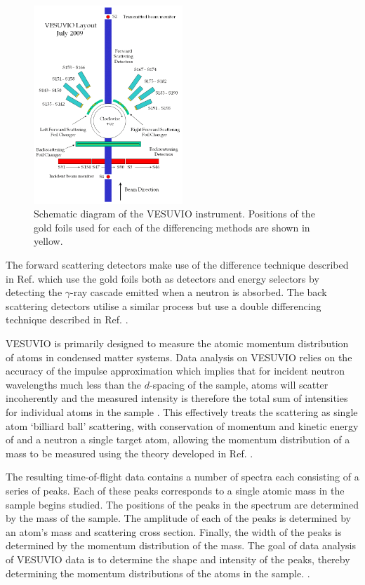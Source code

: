 \documentclass[paper=a4, fontsize=11pt]{scrartcl}	%
\numberwithin{equation}{section}															%
\numberwithin{figure}{section}																%
\numberwithin{table}{section}
\begin{document}
\begin{figure}[H]
\centering
\includegraphics[width=0.5\textwidth]{img/vesuvio-diagram.png}
\caption{Schematic diagram of the VESUVIO instrument. Positions of the gold foils used for each of the differencing methods are shown in yellow.}
\label{fig:VESUVIO-diagram}
\end{figure}

The forward scattering detectors make use of the difference technique described in Ref. \cite{schooneveld2006foil} which use the gold foils both as detectors and energy selectors by detecting the $\gamma$-ray cascade emitted when a neutron is absorbed. The back scattering detectors utilise a similar process but use a double differencing technique described in Ref. \cite{seeger1985double}.

VESUVIO is primarily designed to measure the atomic momentum distribution of atoms in condensed matter systems. Data analysis on VESUVIO relies on the accuracy of the impulse approximation which implies that for incident neutron wavelengths much less than the $d$-spacing of the sample, atoms will scatter incoherently and the measured intensity is therefore the total sum of intensities for individual atoms in the sample \cite{fernandezalonso2013neutron}. This effectively treats the scattering as single atom `billiard ball' scattering, with conservation of momentum and kinetic energy of and a neutron a single target atom, allowing the momentum distribution of a mass to be measured using the theory developed in Ref. \cite{mayers2004vesuvio}.

The resulting time-of-flight data contains a number of spectra each consisting of a series of peaks. Each of these peaks corresponds to a single atomic mass in the sample begins studied. The positions of the peaks in the spectrum are determined by the mass of the sample. The amplitude of each of the peaks is determined by an atom's mass and scattering cross section. Finally, the width of the peaks is determined by the momentum distribution of the mass. The goal of data analysis of VESUVIO data is to determine the shape and intensity of the peaks, thereby determining the momentum distributions of the atoms in the sample. \cite{mayers2010user}.
\end{document}
